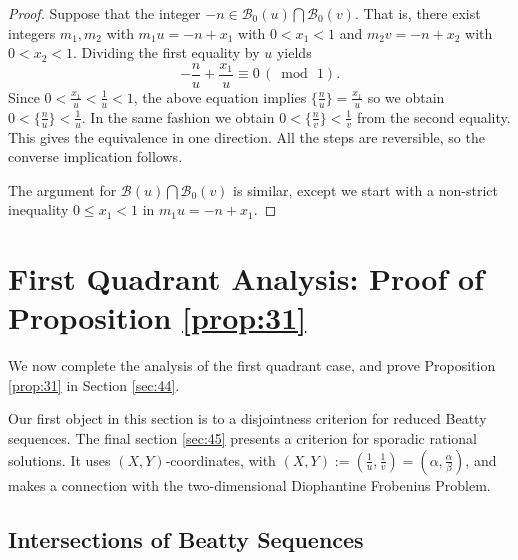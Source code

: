 \documentclass[12pt,letterpaper, reqno]{amsart}
\theoremstyle{definition}
\theoremstyle{remark}
\newcommand{\sB}{{\mathcal B}}
\begin{document}
 
\begin{proof} 
Suppose that the integer $-n \in \sB_0(u) \bigcap \sB_0(v)$. That is, there
exist integers $m_1,m_2$ with
$m_1u = -n + x_1$ with $0< x_1 <1$ and $m_2 v= -n+ x_2$ with $0< x_2 <1$.
Dividing the first equality by $u$ yields 
$$-\frac{n}{u} + \frac{x_1}{u} \equiv 0 \, (\bmod \, 1).$$
Since $0 < \frac{x_1}{u} < \frac{1}{u}<1$, the above equation implies  $ \{ \frac{n}{u} \}= \frac{x_1}{u}$ 
so we obtain $ 0 < \{ \frac{n}{u} \}< \frac{1}{u}$. In the same fashion we obtain $0 <\{ \frac{n}{v} \}< \frac{1}{v}$
from the second equality. This gives the equivalence in one direction.
All the steps are reversible, so the converse implication  follows.

The argument for $\sB(u) \bigcap \sB_0(v)$ is similar, except we start with 
a non-strict inequality $0 \le x_1<1$ in $m_1u= -n+ x_1$.
\end{proof}









%
%

\section{First  Quadrant Analysis: Proof of Proposition \ref{prop:31}} \label{sec:5}
\setcounter{equation}{0}

 We now complete the analysis of the first quadrant case, and prove Proposition \ref{prop:31}
 in Section \ref{sec:44}.
 
 
 
 Our first object in this section is to a disjointness criterion for reduced Beatty sequences. 
The final section \ref{sec:45} presents a criterion for sporadic rational solutions. 
It uses $(X,Y)$-coordinates, with $(X, Y) := (\frac{1}{u}, \frac{1}{v}) = (\alpha, \frac{\alpha}{\beta})$,
and makes a connection with the two-dimensional Diophantine Frobenius Problem.


%
%
\subsection{Intersections of Beatty Sequences}\label{sec:43}
\end{document}
